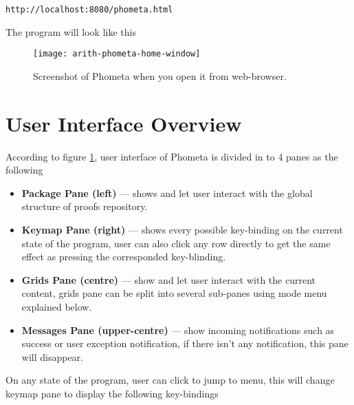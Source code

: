 \documentclass[master.tex]{subfiles}
\begin{document}
\texttt{http://localhost:8080/phometa.html}


The program will look like this

\begin{figure}[H]
    \centering
    \texttt{[image: arith-phometa-home-window]}
    \caption{Screenshot of Phometa when you open it from web-browser.}
\label{fig:specification-phometa-home-window}
\end{figure}

\section{User Interface Overview}

According to figure \ref{fig:specification-phometa-home-window}, user interface
of Phometa is divided in to 4 panes as the following

\begin{itemize}
\item\textbf{Package Pane (left)} --- shows and let user interact with the
  global structure of proofs repository.
\item\textbf{Keymap Pane (right)} --- shows every possible key-binding on the
  current state of the program, user can also click any row directly to get the
  same effect as pressing the corresponded key-blinding.
\item\textbf{Grids Pane (centre)} --- show and let user interact with the
  current content, grids pane can be split into several sub-panes using mode
  menu explained below.
\item\textbf{Messages Pane (upper-centre)} --- show incoming notifications such
  as success or user exception notification, if there isn't any notification,
  this pane will disappear.
\end{itemize}

On any state of the program, user can click  to jump to menu,
this will change keymap pane to display the following key-bindings
\end{document}
